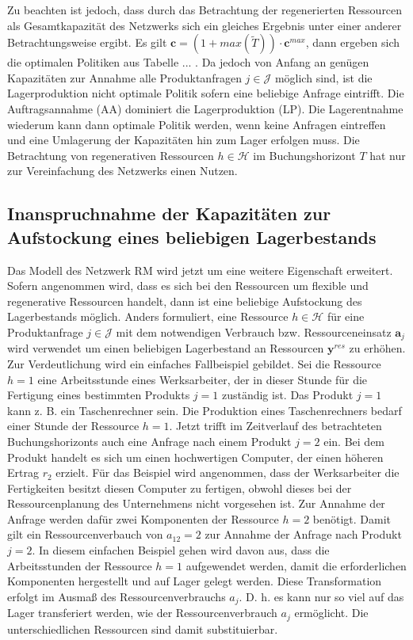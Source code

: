 Zu beachten ist jedoch, dass durch das Betrachtung der regenerierten Ressourcen als Gesamtkapazität des Netzwerks sich ein gleiches Ergebnis unter einer anderer Betrachtungsweise ergibt. Es gilt $\textbf{c}=(1+max(\tilde{T}))\cdot \textbf{c}^{max}$, dann ergeben sich die optimalen Politiken aus Tabelle ... . Da jedoch von Anfang an genügen Kapazitäten zur Annahme alle Produktanfragen $j\in\mathcal{J}$ möglich sind, ist die Lagerproduktion nicht optimale Politik sofern eine beliebige Anfrage eintrifft. Die Auftragsannahme (AA) dominiert die Lagerproduktion (LP). Die Lagerentnahme wiederum kann dann optimale Politik werden, wenn keine Anfragen eintreffen und eine Umlagerung der Kapazitäten hin zum Lager erfolgen muss. Die Betrachtung von regenerativen Ressourcen $h\in\mathcal{H}$ im Buchungshorizont $T$ hat nur zur Vereinfachung des Netzwerks einen Nutzen.



\subsection{Inanspruchnahme der Kapazitäten zur Aufstockung eines beliebigen Lagerbestands}

Das Modell des Netzwerk RM wird jetzt um eine weitere Eigenschaft erweitert. Sofern angenommen wird, dass es sich bei den Ressourcen um flexible und regenerative Ressourcen handelt, dann ist eine beliebige Aufstockung des Lagerbestands möglich. Anders formuliert, eine Ressource $h\in\mathcal{H}$ für eine Produktanfrage $j\in\mathcal{J}$ mit dem notwendigen Verbrauch bzw. Ressourceneinsatz $\textbf{a}_j$ wird verwendet um einen beliebigen Lagerbestand an Ressourcen $\textbf{y}^{res}$ zu erhöhen. Zur Verdeutlichung wird ein einfaches Fallbeispiel gebildet. Sei die Ressource $h=1$ eine Arbeitsstunde eines Werksarbeiter, der in dieser Stunde für die Fertigung eines bestimmten Produkts $j=1$ zuständig ist. Das Produkt $j=1$ kann z. B. ein Taschenrechner sein. Die Produktion eines Taschenrechners bedarf einer Stunde der Ressource $h=1$. Jetzt trifft im Zeitverlauf des betrachteten Buchungshorizonts auch eine Anfrage nach einem Produkt $j=2$ ein. Bei dem Produkt handelt es sich um einen hochwertigen Computer, der einen höheren Ertrag $r_{2}$ erzielt. Für das Beispiel wird angenommen, dass der Werksarbeiter die Fertigkeiten besitzt diesen Computer zu fertigen, obwohl dieses bei der Ressourcenplanung des Unternehmens nicht vorgesehen ist. Zur Annahme der Anfrage werden dafür zwei Komponenten der Ressource $h=2$ benötigt. Damit gilt ein Ressourcenverbauch von $a_12=2$ zur Annahme der Anfrage nach Produkt $j=2$. In diesem einfachen Beispiel gehen wird davon aus, dass die Arbeitsstunden der Ressource $h=1$ aufgewendet werden, damit die erforderlichen Komponenten hergestellt und auf Lager gelegt werden. Diese Transformation erfolgt im Ausmaß des Ressourcenverbrauchs $a_{j}$. D. h. es kann nur so viel auf das Lager transferiert werden, wie der Ressourcenverbrauch $a_{j}$ ermöglicht. Die unterschiedlichen Ressourcen sind damit substituierbar.

